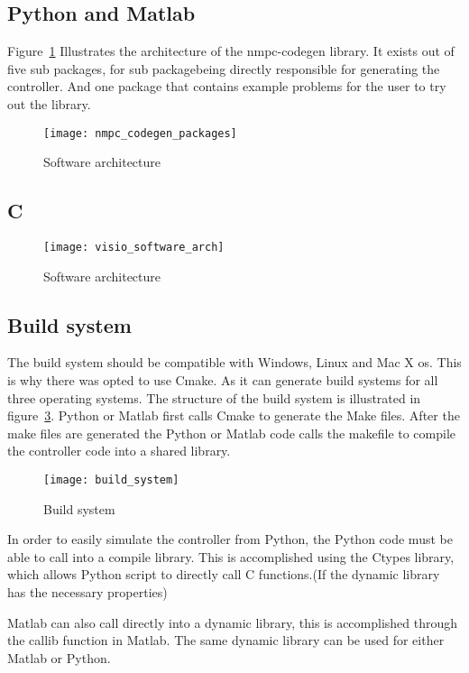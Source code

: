 \subsection{Python and Matlab}
Figure~\ref{fig:nmpc_codegen_packages} Illustrates the architecture of the nmpc-codegen library. It exists out of five sub packages, for sub packagebeing directly responsible for generating the controller. And one package that contains example problems for the user to try out the library.
	\begin{figure}[H]
		\centering
		\texttt{[image: nmpc\_codegen\_packages]}
		\caption{Software architecture}
		\label{fig:nmpc_codegen_packages}
	\end{figure}

\subsection{C}
	\begin{figure}[H]
		\centering
		\texttt{[image: visio\_software\_arch]}
		\caption{Software architecture}
		\label{fig:visio software arch}
	\end{figure}
\subsection{Build system}
The build system should be compatible with Windows, Linux and Mac X os. This is why there was opted to use Cmake. As it can generate build systems for all three operating systems. The structure of the build system is illustrated in figure~\ref{fig:build system}. Python or Matlab first calls Cmake to generate the Make files. After the make files are generated the Python or Matlab code calls the makefile to compile the controller code into a shared library.
\begin{figure}[H]
	\centering
	\texttt{[image: build\_system]}
	\caption{Build system}
	\label{fig:build system}
\end{figure}
In order to easily simulate the controller from Python, the Python code must be able to call into a compile library. This is accomplished using the Ctypes library, which allows Python script to directly call C functions.(If the dynamic library has the necessary properties)

Matlab can also call directly into a dynamic library, this is accomplished through the callib function in Matlab. The same dynamic library can be used for either Matlab or Python.

